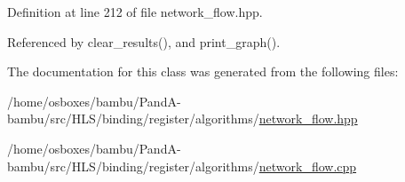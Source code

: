 Definition at line 212 of file network\+\_\+flow.\+hpp.



Referenced by clear\+\_\+results(), and print\+\_\+graph().



The documentation for this class was generated from the following files\+:\begin{DoxyCompactItemize}
\item 
/home/osboxes/bambu/\+Pand\+A-\/bambu/src/\+H\+L\+S/binding/register/algorithms/\hyperlink{network__flow_8hpp}{network\+\_\+flow.\+hpp}\item 
/home/osboxes/bambu/\+Pand\+A-\/bambu/src/\+H\+L\+S/binding/register/algorithms/\hyperlink{network__flow_8cpp}{network\+\_\+flow.\+cpp}\end{DoxyCompactItemize}
